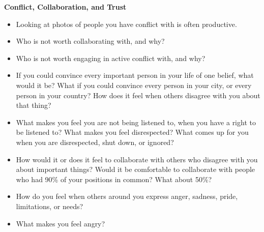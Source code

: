 \documentclass[12pt,letterpaper]{article}
\begin{document}
\noindent \textbf{Conflict, Collaboration, and Trust}
\begin{itemize}
    \item Looking at photos of people you have conflict with is often productive.
    \item Who is not worth collaborating with, and why?
    \item Who is not worth engaging in active conflict with, and why?
    \item If you could convince every important person in your life of one belief, what would it be?  What if you could convince every person in your city, or every person in your country? How does it feel when others disagree with you about that thing?
    \item What makes you feel you are not being listened to, when you have a right to be listened to? What makes you feel disrespected? What comes up for you when you are disrespected, shut down, or ignored?
    \item How would it or does it feel to collaborate with others who disagree with you about important things? Would it be comfortable to collaborate with people who had 90\% of your positions in common? What about 50\%?
    \item How do you feel when others around you express anger, sadness, pride, limitations, or needs?
    \item What makes you feel angry?
\end{itemize}
\end{document}
